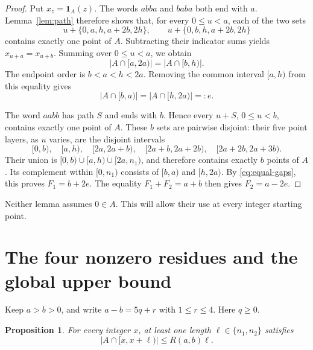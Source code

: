 \documentclass[11pt]{article}
\newtheorem{proposition}[theorem]{Proposition}
\theoremstyle{remark}
\newcommand{\ind}{\mathbf 1}
\begin{document}
\begin{proof}
Put \(x_z=\ind_A(z)\). The words \(abba\) and \(baba\) both end
with \(a\). Lemma~\ref{lem:path} therefore shows that, for every
\(0\le u<a\), each of the two sets
\[
 u+\{0,a,h,a+2b,2h\},\qquad
 u+\{0,b,h,a+2b,2h\}
\]
contains exactly one point of \(A\). Subtracting their indicator sums
yields \(x_{u+a}=x_{u+b}\). Summing over \(0\le u<a\), we obtain
\[
 |A\cap[a,2a)|=|A\cap[b,h)|.
\]
The endpoint order is \(b<a<h<2a\). Removing the common interval
\([a,h)\) from this equality gives
\begin{equation}\label{eq:equal-gaps}
 |A\cap[b,a)|=|A\cap[h,2a)|=:e.
\end{equation}

The word \(aabb\) has path \(S\) and ends with \(b\). Hence every
\(u+S\), \(0\le u<b\), contains exactly one point of \(A\).
These \(b\) sets are pairwise disjoint: their five point layers, as
\(u\) varies, are the disjoint intervals
\[
 [0,b),\quad [a,h),\quad [2a,2a+b),\quad
 [2a+b,2a+2b),\quad [2a+2b,2a+3b).
\]
Their union is
\([0,b)\mathbin{\dot\cup}[a,h)\mathbin{\dot\cup}[2a,n_1)\),
and therefore contains exactly \(b\) points of \(A\). Its complement
within \([0,n_1)\) consists of \([b,a)\) and \([h,2a)\). By
\eqref{eq:equal-gaps}, this proves \(F_1=b+2e\). The equality
\(F_1+F_2=a+b\) then gives \(F_2=a-2e\).
\end{proof}

Neither lemma assumes \(0\in A\). This will allow their use at every
integer starting point.

\section{The four nonzero residues and the global upper bound}

Keep \(a>b>0\), and write \(a-b=5q+r\) with \(1\le r\le4\).
Here \(q\ge0\).

\begin{proposition}\label{prop:local}
For every integer \(x\), at least one length
\(\ell\in\{n_1,n_2\}\) satisfies
\begin{equation}\label{eq:good-window}
 |A\cap[x,x+\ell)|\le R(a,b)\ell.
\end{equation}
\end{proposition}
\end{document}
